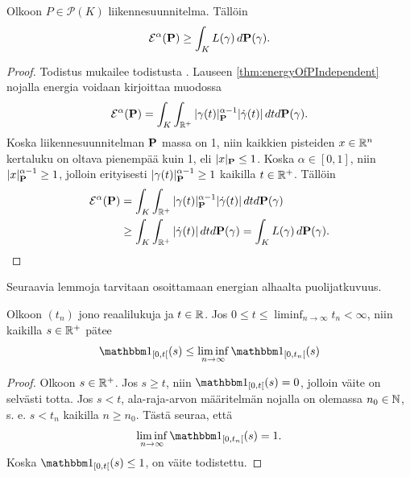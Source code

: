 \begin{lemma}\label{le:nrgGeThanLength}
    Olkoon $P \in \mathcal{P}(K)$ liikennesuunnitelma. Tällöin
        \begin{equation*}
            \E^\alpha(\P) \ge \int_K L(\gamma) \, d\P(\gamma).
        \end{equation*}
\end{lemma}

\begin{proof}
    Todistus mukailee todistusta \cite[p. 36]{OptimalTransportationNetworks}. Lauseen \ref{thm:energyOfPIndependent} nojalla energia voidaan kirjoittaa muodossa
    \begin{equation*}
        \E^\alpha(\P) = \int_K \int_{\R^+}|\gamma(t)|^{\alpha-1}_\P|\dot\gamma(t)| \, dtd\P(\gamma).
    \end{equation*}
     Koska liikennesuunnitelman $\P$ massa on 1, niin kaikkien pisteiden $x \in \R^n$ kertaluku on oltava pienempää kuin 1, eli  $|x|_\P \le 1$. Koska $\alpha \in [0, 1]$, niin  $|x|^{\alpha-1}_\P \ge 1$, jolloin erityisesti $|\gamma(t)|^{\alpha-1}_\P \ge 1$ kaikilla $t \in \Rp$. Tällöin
    \begin{align*}
        \E^\alpha(\P) &= \int_K \int_{\R^+}|\gamma(t)|^{\alpha-1}_\P|\dot\gamma(t)| \, dtd\P(\gamma) \\ 
        &\ge \int_K \int_{\R^+}|\dot\gamma(t)| \, dtd\P(\gamma) = \int_K L(\gamma) \, d\P(\gamma).
    \end{align*}
\end{proof}

Seuraavia lemmoja tarvitaan osoittamaan energian alhaalta puolijatkuvuus.
\begin{lemma} \label{le:indFct}
    Olkoon $(t_n)$ jono reaalilukuja ja $t\in \R$.
    Jos $\displaystyle 0 \le t \le \liminf_{n\to\infty} t_n < \infty$, niin kaikilla $s \in \Rp$ pätee
         \begin{equation*}
             \indfct{[0, t[}(s) \le \liminf_{n\to\infty} \indfct{[0, t_n[}(s)
         \end{equation*}
 \end{lemma}
\begin{proof}
    Olkoon $s \in \Rp$. Jos $s \ge t$, niin $\indfct{[0, t[}(s) = 0$, jolloin väite on selvästi totta.
    Jos $s < t$, ala-raja-arvon määritelmän nojalla on olemassa $n_0 \in \N$, s. e. $s < t_n$ kaikilla $n \ge n_0$. Tästä seuraa, että
        \begin{equation*}
            \liminf_{n \to \infty} \indfct{[0, t_n[}(s) = 1.
        \end{equation*}
    Koska $\indfct{[0, t[}(s) \le 1$, on väite todistettu.
\end{proof}


